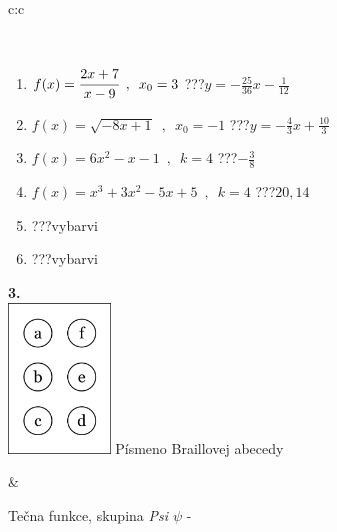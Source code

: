 \documentclass[10pt]{report}
\begin{document}
\begin{tabular}{c:c}
\begin{minipage}[c][104.5mm][t]{0.5\linewidth}
\begin{center}
\begin{minipage}{0.95\linewidth}
\begin{center}
\end{center}
\end{minipage}
\\[1mm]
\begin{minipage}{0.79\linewidth}
\begin{center}
\begin{varwidth}{\linewidth}
\begin{enumerate}
\small
\item $f(x)=\cfrac{2x+7}{x-9}\enspace , \enspace x_0=3$\quad \dotfill\; ???\;\dotfill \quad $y = -\frac{25}{36}x-\frac{1}{12}$
\item $f(x)=\sqrt{-8x+1}\enspace , \enspace x_0=-1$\quad \dotfill\; ???\;\dotfill \quad $y = -\frac{4}{3}x+\frac{10}{3}$
\item $f(x)=6x^2-x-1\enspace , \enspace k=4$\quad \dotfill\; ???\;\dotfill \quad $-\frac{3}{8}$
\item $f(x)=x^3+3x^2-5x+5\enspace , \enspace k=4$\quad \dotfill\; ???\;\dotfill \quad $20 , 14$
\item \quad \dotfill\; ???\;\dotfill \quad vybarvi
\item \quad \dotfill\; ???\;\dotfill \quad vybarvi
\end{enumerate}
\end{varwidth}
\end{center}
\end{minipage}
\begin{minipage}{0.20\linewidth}
\begin{center}
{\Huge\bfseries 3.} \\[2mm]
\includegraphics[height=40mm]{../images/braille.png}
{\small Písmeno Braillovej abecedy}
\end{center}
\end{minipage}
\end{center}
\end{minipage}
&
\begin{minipage}[c][104.5mm][t]{0.5\linewidth}
\begin{center}
\vspace{7mm}
{\huge Tečna funkce, skupina \textit{Psi $\psi$} -}\\[5mm]

\end{center}
\end{minipage}
\end{tabular}
\end{document}
